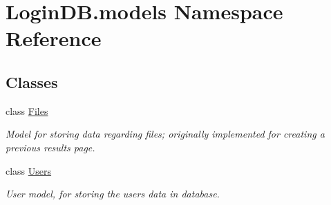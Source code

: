 \hypertarget{namespace_login_d_b_1_1models}{}\section{Login\+D\+B.\+models Namespace Reference}
\label{namespace_login_d_b_1_1models}
\subsection*{Classes}
\begin{DoxyCompactItemize}
\item 
class \hyperlink{class_login_d_b_1_1models_1_1_files}{Files}
\begin{DoxyCompactList}\small\item\em Model for storing data regarding files; originally implemented for creating a previous results page. \end{DoxyCompactList}\item 
class \hyperlink{class_login_d_b_1_1models_1_1_users}{Users}
\begin{DoxyCompactList}\small\item\em User model, for storing the user\textquotesingle{}s data in database. \end{DoxyCompactList}\end{DoxyCompactItemize}
